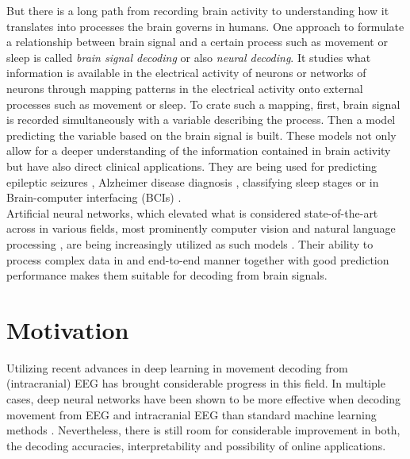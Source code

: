 But there is a long path from recording brain activity to understanding how it translates into processes the brain governs in humans.
One approach to formulate a relationship between brain signal and a certain process such as movement or sleep is called \textit{brain signal decoding} or also \textit{neural decoding}.
It studies what information is available in the electrical activity of neurons or networks of neurons through mapping patterns in the electrical activity onto external processes such as movement or sleep.
To crate such a mapping, first, brain signal is recorded simultaneously with a variable describing the process. 
Then a model predicting the variable based on the brain signal is built.
These models not only allow for a deeper understanding of the information contained in brain activity but have also direct clinical applications.
They are being used for predicting epileptic seizures \cite{epileptic-seizures-eeg}, Alzheimer disease diagnosis \cite{alzheimer-eeg}, classifying sleep stages \cite{sleep-stage-alg-comparison} or in Brain-computer interfacing (BCIs) \cite{ecog-bci, eeg-bci} .\\

Artificial neural networks, which elevated what is considered state-of-the-art across in various fields, most prominently computer vision \cite{dnn-computer-vision} and natural language processing \cite{dnn-nlp}, are being increasingly utilized as such models \cite{Roy-2019}. 
Their ability to process complex data in and end-to-end manner together with good prediction performance makes them suitable for decoding from brain signals. 


\section*{Motivation}
Utilizing recent advances in deep learning in movement decoding from (intracranial) EEG has brought considerable progress in this field.
In multiple cases, deep neural networks have been shown to be more effective when decoding movement from EEG and intracranial EEG than standard machine learning methods \cite{Zhang-2019, Hammer-2021, eeg-net, sleep-eegnet}.
Nevertheless, there is still room for considerable improvement in both, the decoding accuracies, interpretability and possibility of online applications. \\

